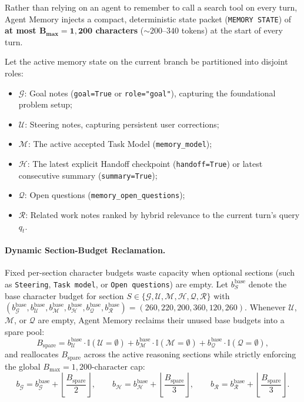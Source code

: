\documentclass[11pt,a4paper]{article}
\begin{document}
Rather than relying on an agent to remember to call a search tool on every turn, Agent Memory injects a compact, deterministic state packet (\texttt{MEMORY STATE}) of \textbf{at most $\mathbf{B_{\max} = 1{,}200}$ characters} ($\sim 200$--$340$ tokens) at the start of every turn.

Let the active memory state on the current branch be partitioned into disjoint roles:
\begin{itemize}[leftmargin=1.5em,itemsep=1pt]
    \item $\mathcal{G}$: Goal notes (\texttt{goal=True} or \texttt{role="goal"}), capturing the foundational problem setup;
    \item $\mathcal{U}$: Steering notes, capturing persistent user corrections;
    \item $\mathcal{M}$: The active accepted Task Model (\texttt{memory\_model});
    \item $\mathcal{H}$: The latest explicit Handoff checkpoint (\texttt{handoff=True}) or latest consecutive summary (\texttt{summary=True});
    \item $\mathcal{Q}$: Open questions (\texttt{memory\_open\_questions});
    \item $\mathcal{R}$: Related work notes ranked by hybrid relevance to the current turn's query $q_t$.
\end{itemize}

\paragraph{Dynamic Section-Budget Reclamation.}
Fixed per-section character budgets waste capacity when optional sections (such as \texttt{Steering}, \texttt{Task model}, or \texttt{Open questions}) are empty. Let $b_S^{\text{base}}$ denote the base character budget for section $S \in \{\mathcal{G}, \mathcal{U}, \mathcal{M}, \mathcal{H}, \mathcal{Q}, \mathcal{R}\}$ with $(b_{\mathcal{G}}^{\text{base}}, b_{\mathcal{U}}^{\text{base}}, b_{\mathcal{M}}^{\text{base}}, b_{\mathcal{H}}^{\text{base}}, b_{\mathcal{Q}}^{\text{base}}, b_{\mathcal{R}}^{\text{base}}) = (260, 220, 200, 360, 120, 260)$. Whenever $\mathcal{U}$, $\mathcal{M}$, or $\mathcal{Q}$ are empty, Agent Memory reclaims their unused base budgets into a spare pool:
\begin{equation}
    B_{\text{spare}} = b_{\mathcal{U}}^{\text{base}}\cdot\mathbb{I}(\mathcal{U}=\emptyset) + b_{\mathcal{M}}^{\text{base}}\cdot\mathbb{I}(\mathcal{M}=\emptyset) + b_{\mathcal{Q}}^{\text{base}}\cdot\mathbb{I}(\mathcal{Q}=\emptyset),
\end{equation}
and reallocates $B_{\text{spare}}$ across the active reasoning sections while strictly enforcing the global $B_{\max} = 1{,}200$-character cap:
\begin{equation}
    b_{\mathcal{G}} = b_{\mathcal{G}}^{\text{base}} + \left\lfloor \frac{B_{\text{spare}}}{2} \right\rfloor, \qquad
    b_{\mathcal{H}} = b_{\mathcal{H}}^{\text{base}} + \left\lfloor \frac{B_{\text{spare}}}{3} \right\rfloor, \qquad
    b_{\mathcal{R}} = b_{\mathcal{R}}^{\text{base}} + \left\lfloor \frac{B_{\text{spare}}}{3} \right\rfloor.
\end{equation}
\end{document}
